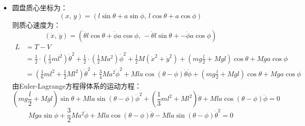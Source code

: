 \documentclass[a4paper,fontset=windows]{ctexart}
\begin{document}
\begin{itemize}
        \bigskip
        \item[5.4]
        圆盘质心坐标为：
        \[
        (x,\, y) = (l\sin\theta + a\sin\phi,\, l\cos\theta + a\cos\phi)
        \]
        则质心速度为：
        \[
        (\dot{x},\, \dot{y}) = (\dot{\theta}l\cos\theta + \dot{\phi}a\cos\phi,\, -\dot{\theta}l\sin\theta + -\dot{\phi}a\cos\phi)
        \]
        \begin{align*}
        L
        &= T-V \\
        &= \frac{1}{2}\cdot\left(\frac{1}{3}ml^2\right)\dot{\theta}^2 + \frac{1}{2}\cdot\left(\frac{1}{2}Ma^2\right)\dot{\phi}^2 + \frac{1}{2}M(\dot{x}^2+\dot{y}^2) + \left(mg\frac{l}{2} + Mgl\right)\cos\theta + Mga\cos\phi \\
        &= \left(\frac{1}{6}ml^2 + \frac{1}{2}Ml^2\right)\dot{\theta}^2 + \frac{3}{4}Ma^2\dot{\phi}^2 + Mla\cos(\theta-\phi)\dot{\theta}\dot{\phi} + \left(mg\frac{l}{2} + Mgl\right)\cos\theta + Mga\cos\phi
        \end{align*}
        由Euler-Lagrange方程得体系的运动方程：
        \[
        \left(mg\frac{l}{2} + Mgl\right)\sin\theta + Mla\sin(\theta-\phi)\dot{\phi}^2 + \left(\frac{1}{3}ml^2 + Ml^2\right)\ddot{\theta} + Mla\cos(\theta-\phi)\ddot{\phi} = 0
        \]
        \[
        Mga\sin\phi + \frac{3}{2}Ma^2\ddot{\phi} + Mla\cos(\theta-\phi)\ddot{\theta} - Mla\sin(\theta-\phi)\dot{\theta}^2 = 0
        \]


\end{itemize}
\end{document}
